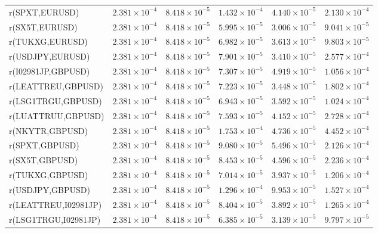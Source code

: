 \documentclass[10pt,a4paper]{article}
\begin{document}
\begin{tabular*}{\linewidth}{@{\extracolsep{\fill}}lrrrrr@{}}
r(SPXT,EURUSD) & $2.381\times10^{-4}$ & $8.418\times10^{-5}$ & $1.432\times10^{-4}$ & $4.140\times10^{-5}$ & $2.130\times10^{-4}$ \\
r(SX5T,EURUSD) & $2.381\times10^{-4}$ & $8.418\times10^{-5}$ & $5.995\times10^{-5}$ & $3.006\times10^{-5}$ & $9.041\times10^{-5}$ \\
r(TUKXG,EURUSD) & $2.381\times10^{-4}$ & $8.418\times10^{-5}$ & $6.982\times10^{-5}$ & $3.613\times10^{-5}$ & $9.803\times10^{-5}$ \\
r(USDJPY,EURUSD) & $2.381\times10^{-4}$ & $8.418\times10^{-5}$ & $7.901\times10^{-5}$ & $3.410\times10^{-5}$ & $2.577\times10^{-4}$ \\
r(I02981JP,GBPUSD) & $2.381\times10^{-4}$ & $8.418\times10^{-5}$ & $7.307\times10^{-5}$ & $4.919\times10^{-5}$ & $1.056\times10^{-4}$ \\
r(LEATTREU,GBPUSD) & $2.381\times10^{-4}$ & $8.418\times10^{-5}$ & $7.223\times10^{-5}$ & $3.448\times10^{-5}$ & $1.802\times10^{-4}$ \\
r(LSG1TRGU,GBPUSD) & $2.381\times10^{-4}$ & $8.418\times10^{-5}$ & $6.943\times10^{-5}$ & $3.592\times10^{-5}$ & $1.024\times10^{-4}$ \\
r(LUATTRUU,GBPUSD) & $2.381\times10^{-4}$ & $8.418\times10^{-5}$ & $7.593\times10^{-5}$ & $4.152\times10^{-5}$ & $2.728\times10^{-4}$ \\
r(NKYTR,GBPUSD) & $2.381\times10^{-4}$ & $8.418\times10^{-5}$ & $1.753\times10^{-4}$ & $4.736\times10^{-5}$ & $4.452\times10^{-4}$ \\
r(SPXT,GBPUSD) & $2.381\times10^{-4}$ & $8.418\times10^{-5}$ & $9.080\times10^{-5}$ & $5.496\times10^{-5}$ & $2.126\times10^{-4}$ \\
r(SX5T,GBPUSD) & $2.381\times10^{-4}$ & $8.418\times10^{-5}$ & $8.453\times10^{-5}$ & $4.596\times10^{-5}$ & $2.236\times10^{-4}$ \\
r(TUKXG,GBPUSD) & $2.381\times10^{-4}$ & $8.418\times10^{-5}$ & $7.014\times10^{-5}$ & $3.937\times10^{-5}$ & $1.206\times10^{-4}$ \\
r(USDJPY,GBPUSD) & $2.381\times10^{-4}$ & $8.418\times10^{-5}$ & $1.296\times10^{-4}$ & $9.953\times10^{-5}$ & $1.527\times10^{-4}$ \\
r(LEATTREU,I02981JP) & $2.381\times10^{-4}$ & $8.418\times10^{-5}$ & $8.404\times10^{-5}$ & $3.892\times10^{-5}$ & $1.265\times10^{-4}$ \\
r(LSG1TRGU,I02981JP) & $2.381\times10^{-4}$ & $8.418\times10^{-5}$ & $6.385\times10^{-5}$ & $3.139\times10^{-5}$ & $9.797\times10^{-5}$ \\

\end{tabular*}
\end{document}
